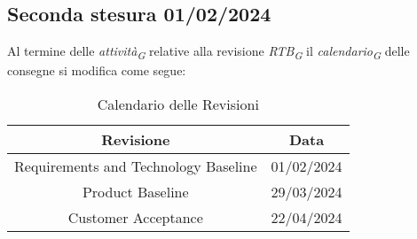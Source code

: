 \subsection{Seconda stesura 01/02/2024}\label{sec:SecondaStesuraCalendario}
Al termine delle \textit{attività}\textsubscript{\textit{G}} relative alla revisione \textit{RTB}\textsubscript{\textit{G}} il \textit{calendario}\textsubscript{\textit{G}} delle consegne si modifica come segue:
\begin{table}[H]
    \centering
    \begin{tabular}{|c|c|}
        \hline
        \textbf{Revisione} & \textbf{Data} \\
        \hline
        Requirements and Technology Baseline & 01/02/2024 \\
        Product Baseline  & 29/03/2024 \\
        Customer Acceptance & 22/04/2024 \\
        \hline
    \end{tabular}
    \caption{Calendario delle Revisioni}
\end{table}